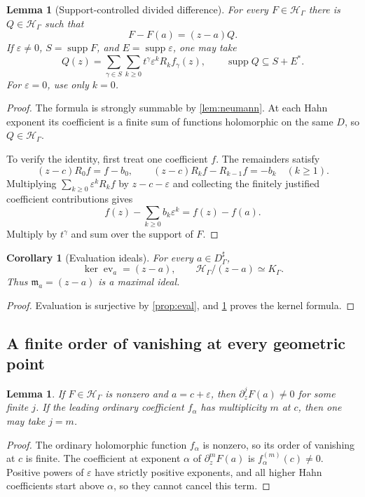 \documentclass[11pt,letterpaper]{article}
\numberwithin{equation}{section}
\newtheorem{lemma}[theorem]{Lemma}
\newtheorem{corollary}[theorem]{Corollary}
\theoremstyle{definition}
\theoremstyle{remark}
\newcommand{\HH}{\mathcal H}
\newcommand{\mm}{\mathfrak m}
\newcommand{\ev}{\operatorname{ev}}
\newcommand{\supp}{\operatorname{supp}}
\begin{document}
\begin{lemma}[Support-controlled divided difference]\label{lem:division}
For every $F\in\HH_\Gamma$ there is $Q\in\HH_\Gamma$ such that
\begin{equation}\label{eq:division}
 F-F(a)=(z-a)Q.
\end{equation}
If $\varepsilon\ne0$, $S=\supp F$, and $E=\supp\varepsilon$, one may
take
\begin{equation}\label{eq:division-explicit}
 Q(z)=\sum_{\gamma\in S}\sum_{k\ge0}
          t^\gamma\varepsilon^k R_kf_\gamma(z),
 \qquad \supp Q\subseteq S+E^*.
\end{equation}
For $\varepsilon=0$, use only $k=0$.
\end{lemma}
\begin{proof}
The formula is strongly summable by \cref{lem:neumann}. At each Hahn
exponent its coefficient is a finite sum of functions holomorphic on the
same $D$, so $Q\in\HH_\Gamma$.

To verify the identity, first treat one coefficient $f$. The remainders
satisfy
\[
 (z-c)R_0f=f-b_0,\qquad
 (z-c)R_kf-R_{k-1}f=-b_k\quad(k\ge1).
\]
Multiplying $\sum_{k\ge0}\varepsilon^kR_kf$ by
$z-c-\varepsilon$ and collecting the finitely justified coefficient
contributions gives
\[
 f(z)-\sum_{k\ge0}b_k\varepsilon^k=f(z)-f(a).
\]
Multiply by $t^\gamma$ and sum over the support of $F$.
\end{proof}

\begin{corollary}[Evaluation ideals]\label{cor:eval-ideal}
For every $a\in D^\sharp_\Gamma$,
\[
 \ker\ev_a=(z-a),\qquad \HH_\Gamma/(z-a)\simeq K_\Gamma.
\]
Thus $\mm_a=(z-a)$ is a maximal ideal.
\end{corollary}
\begin{proof}
Evaluation is surjective by \cref{prop:eval}, and
\cref{lem:division} proves the kernel formula.
\end{proof}

\subsection{A finite order of vanishing at every geometric point}
\begin{lemma}\label{lem:finite-order}
If $F\in\HH_\Gamma$ is nonzero and $a=c+\varepsilon$, then
$\partial_z^jF(a)\ne0$ for some finite $j$. If the leading ordinary
coefficient $f_\alpha$ has multiplicity $m$ at $c$, then one may take
$j=m$.
\end{lemma}
\begin{proof}
The ordinary holomorphic function $f_\alpha$ is nonzero, so its order of
vanishing at $c$ is finite. The coefficient at exponent $\alpha$ of
$\partial_z^mF(a)$ is $f_\alpha^{(m)}(c)\ne0$. Positive powers of
$\varepsilon$ have strictly positive exponents, and all higher Hahn
coefficients start above $\alpha$, so they cannot cancel this term.
\end{proof}
\end{document}
